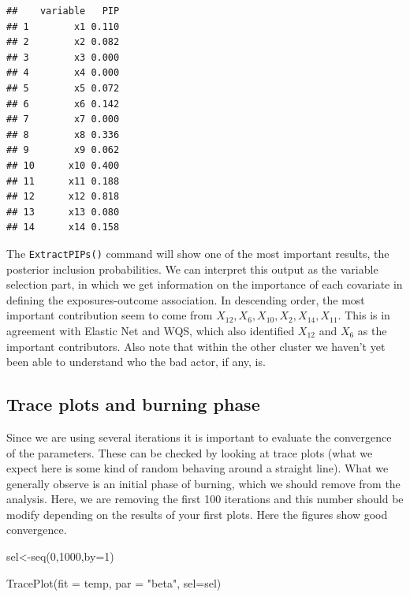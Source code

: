 \documentclass[
]{book}
\newenvironment{Shaded}{\begin{snugshade}}{\end{snugshade}}
\newcommand{\AttributeTok}[1]{\textcolor[rgb]{0.77,0.63,0.00}{#1}}
\newcommand{\DecValTok}[1]{\textcolor[rgb]{0.00,0.00,0.81}{#1}}
\newcommand{\FunctionTok}[1]{\textcolor[rgb]{0.00,0.00,0.00}{#1}}
\newcommand{\NormalTok}[1]{#1}
\newcommand{\OtherTok}[1]{\textcolor[rgb]{0.56,0.35,0.01}{#1}}
\newcommand{\StringTok}[1]{\textcolor[rgb]{0.31,0.60,0.02}{#1}}
\begin{document}
\begin{verbatim}
##    variable   PIP
## 1        x1 0.110
## 2        x2 0.082
## 3        x3 0.000
## 4        x4 0.000
## 5        x5 0.072
## 6        x6 0.142
## 7        x7 0.000
## 8        x8 0.336
## 9        x9 0.062
## 10      x10 0.400
## 11      x11 0.188
## 12      x12 0.818
## 13      x13 0.080
## 14      x14 0.158
\end{verbatim}

The \texttt{ExtractPIPs()} command will show one of the most important results, the posterior inclusion probabilities. We can interpret this output as the variable selection part, in which we get information on the importance of each covariate in defining the exposures-outcome association. In descending order, the most important contribution seem to come from \(X_{12}, X_{6}, X_{10}, X_{2}, X_{14}, X_{11}\). This is in agreement with Elastic Net and WQS, which also identified \(X_{12}\) and \(X_6\) as the important contributors. Also note that within the other cluster we haven't yet been able to understand who the bad actor, if any, is.

\hypertarget{trace-plots-and-burning-phase}{%
\subsection{Trace plots and burning phase}\label{trace-plots-and-burning-phase}}

Since we are using several iterations it is important to evaluate the convergence of the parameters. These can be checked by looking at trace plots (what we expect here is some kind of random behaving around a straight line). What we generally observe is an initial phase of burning, which we should remove from the analysis. Here, we are removing the first 100 iterations and this number should be modify depending on the results of your first plots. Here the figures show good convergence.

\begin{Shaded}
\begin{Highlighting}[]
\NormalTok{sel}\OtherTok{\textless{}{-}}\FunctionTok{seq}\NormalTok{(}\DecValTok{0}\NormalTok{,}\DecValTok{1000}\NormalTok{,}\AttributeTok{by=}\DecValTok{1}\NormalTok{)}
\end{Highlighting}
\end{Shaded}

\begin{Shaded}
\begin{Highlighting}[]
\FunctionTok{TracePlot}\NormalTok{(}\AttributeTok{fit =}\NormalTok{ temp, }\AttributeTok{par =} \StringTok{"beta"}\NormalTok{, }\AttributeTok{sel=}\NormalTok{sel)}
\end{Highlighting}
\end{Shaded}
\end{document}
